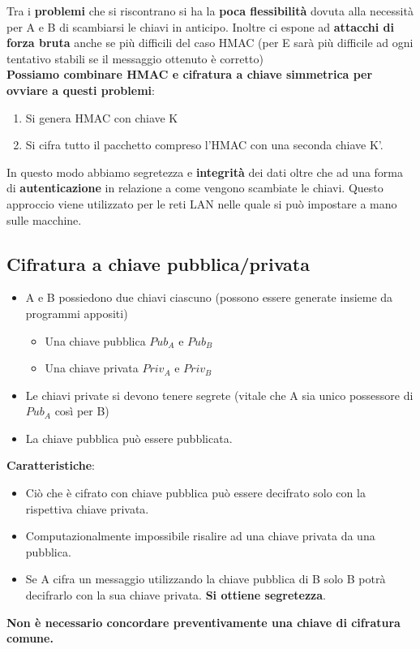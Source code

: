 \documentclass[12pt]{article}
\begin{document}
			Tra i \textbf{problemi} che si riscontrano si ha la \textbf{poca flessibilità} dovuta alla necessità per A e B di scambiarsi le chiavi in anticipo. Inoltre ci espone ad \textbf{attacchi di forza bruta} anche se più difficili del caso HMAC (per E sarà più difficile ad ogni tentativo stabili se il messaggio ottenuto è corretto)\\
			\textbf{Possiamo combinare HMAC e cifratura a chiave simmetrica per ovviare a questi problemi}:
			\begin{enumerate}
				\item Si genera HMAC con chiave K
				\item Si cifra tutto il pacchetto compreso l'HMAC con una seconda chiave K'.
			\end{enumerate}
			In questo modo abbiamo segretezza e \textbf{integrità} dei dati oltre che ad una forma di \textbf{autenticazione} in relazione a come vengono scambiate le chiavi. Questo approccio viene utilizzato per le reti LAN nelle quale si può impostare a mano sulle macchine.
			
		\subsection{Cifratura a chiave pubblica/privata}
			\begin{itemize}
				\item A e B possiedono due chiavi ciascuno (possono essere generate insieme da programmi appositi)
				\begin{itemize}
					\item Una chiave pubblica $Pub_{A}$ e $Pub_{B}$
					\item Una chiave privata $Priv_{A}$ e $Priv_{B}$
				\end{itemize}
				\item Le chiavi private si devono tenere segrete (vitale che A sia unico possessore di $Pub_{A}$ così per B)
				\item La chiave pubblica può essere pubblicata.
			\end{itemize}
			\textbf{Caratteristiche}:
			\begin{itemize}
				\item Ciò che è cifrato con chiave pubblica può essere decifrato solo con la rispettiva chiave privata.
				\item Computazionalmente impossibile risalire ad una chiave privata da una pubblica.
				\item Se A cifra un messaggio utilizzando la chiave pubblica di B solo B potrà decifrarlo con la sua chiave privata. \textbf{Si ottiene segretezza}.
			\end{itemize}
			\textbf{Non è necessario concordare preventivamente una chiave di cifratura comune.}
		
\end{document}
